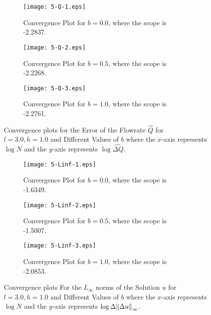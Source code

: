 \documentclass{assignment}[2019/10/15]
\begin{document}
    \begin{figure}[htb]
        \begin{subfigure}[b]{0.32\textwidth}
            \centering
            \texttt{[image: 5-Q-1.eps]}
            \caption{Convergence Plot for $b = 0.0$, where the scope is -2.2837.}
        \end{subfigure}
        \hfill
        \begin{subfigure}[b]{0.32\textwidth}
            \centering
            \texttt{[image: 5-Q-2.eps]}
            \caption{Convergence Plot for $b = 0.5$, where the scope is -2.2268.}
        \end{subfigure}
        \hfill
        \begin{subfigure}[b]{0.32\textwidth}
            \centering
            \texttt{[image: 5-Q-3.eps]}
            \caption{Convergence Plot for $b = 1.0$, where the scope is -2.2761.}
        \end{subfigure}
        \caption{Convergence plots for the Error of the Flowrate $\hat Q$ for $l = 3.0, h = 1.0$ and Different Values of $b$ where the $x$-axis represents $\log N$ and the $y$-axis represents $\log \hat{\Delta Q}$.}
        \label{fig: q5-Q}
    \end{figure}

    \begin{figure}[htb]
        \begin{subfigure}[b]{0.32\textwidth}
            \centering
            \texttt{[image: 5-Linf-1.eps]}
            \caption{Convergence Plot for $b = 0.0$, where the scope is -1.6349.}
        \end{subfigure}
        \hfill
        \begin{subfigure}[b]{0.32\textwidth}
            \centering
            \texttt{[image: 5-Linf-2.eps]}
            \caption{Convergence Plot for $b = 0.5$, where the scope is -1.5007.}
        \end{subfigure}
        \hfill
        \begin{subfigure}[b]{0.32\textwidth}
            \centering
            \texttt{[image: 5-Linf-3.eps]}
            \caption{Convergence Plot for $b = 1.0$, where the scope is -2.0853.}
        \end{subfigure}
        \caption{Convergence plots For the $L_\infty$ norms of the Solution $u$ for $l = 3.0, h = 1.0$ and Different Values of $b$ where the $x$-axis represents $\log N$ and the $y$-axis represents $\log \Delta \norm{\Delta u}_\infty$.}
        \label{fig: q5-Linf}
    \end{figure}
\end{document}

